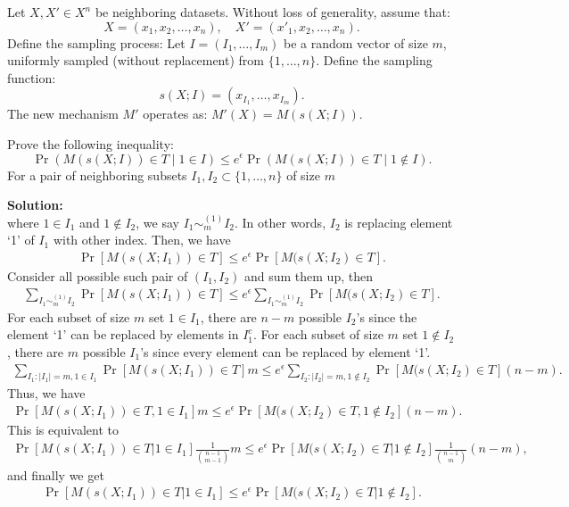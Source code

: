 \documentclass[12pt]{article}
\begin{document}
\begin{enumerate}
Let $X, X' \in X^n$ be neighboring datasets. Without loss of generality, assume that:
\[
X = (x_1, x_2, \dots, x_n), \quad X' = (x'_1, x_2, \dots, x_n).
\]
Define the sampling process:
Let $I = (I_1, \dots, I_m)$ be a random vector of size $m$, uniformly sampled (without replacement) from $\{1, \dots, n\}$.
Define the sampling function:
\[
s(X; I) = (x_{I_1}, \dots, x_{I_m}).
\]
The new mechanism $M'$ operates as: $M'(X) = M(s(X; I))$.

Prove the following inequality:
\[
\Pr(M (s(X; I)) \in T \mid 1 \in I) \leq e^{\epsilon} \Pr(M (s(X; I)) \in T \mid 1 \notin I).
\]
For a pair of neighboring subsets $I_1, I_2\subset \{1, \dots, n\}$ of size $m$ 
\begin{solution}
{\bf Solution:}\\
where $1\in I_1$ and $1\notin I_2$, we say $I_1 \sim_m^{(1)} I_2$.
In other words, $I_2$ is replacing element `1' of $I_1$ with other index.
Then, we have
\begin{align}
    \Pr[M(s(X;I_1))\in T] \leq e^\epsilon \Pr[M(s(X;I_2)\in T].
\end{align}
Consider all possible such pair of $(I_1, I_2)$ and sum them up, then
\begin{align}
    \sum_{I_1\sim_m^{(1)} I_2} \Pr[M(s(X;I_1))\in T] \leq e^\epsilon \sum_{I_1\sim_m^{(1)} I_2} \Pr[M(s(X;I_2)\in T].
\end{align}
For each subset of size $m$ set $1\in I_1$, there are $n-m$ possible $I_2$'s
since the element `1' can be replaced by elements in $I_1^c$.
For each subset of size $m$ set $1\notin I_2$, there are $m$ possible $I_1$'s
since every element can be replaced by element `1'.
\begin{align}
    \sum_{I_1: |I_1|=m, 1\in I_1} \Pr[M(s(X;I_1))\in T] m 
    \leq e^\epsilon \sum_{I_2: |I_2|=m, 1\notin I_2} \Pr[M(s(X;I_2)\in T] (n-m).
\end{align}
Thus, we have
\begin{align}
    \Pr[M(s(X;I_1))\in T, 1\in I_1] m 
    \leq
     e^\epsilon \Pr[M(s(X;I_2)\in T, 1\notin I_2] (n-m).
\end{align}
This is equivalent to 
\begin{align}
    \Pr[M(s(X;I_1))\in T| 1\in I_1] \frac{1}{\binom{n-1}{m-1}} m 
    \leq
    e^\epsilon \Pr[M(s(X;I_2)\in T| 1\notin I_2] \frac{1}{\binom{n-1}{m}} (n-m),
\end{align}
and finally we get
\begin{align}
    \Pr[M(s(X;I_1))\in T| 1\in I_1] 
    \leq
    e^\epsilon \Pr[M(s(X;I_2)\in T| 1\notin I_2].
\end{align}
\end{solution}




\end{enumerate}
\end{document}
